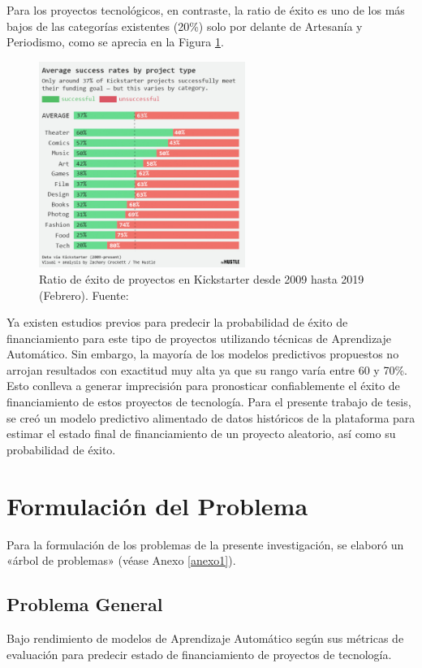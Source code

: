 Para los proyectos tecnológicos, en contraste, la ratio de éxito es uno de los más bajos de las categorías existentes (20\%) solo por delante de Artesanía y Periodismo, como se aprecia en la Figura \ref{1:fig2}.
\begin{figure}[h]
	\begin{center}
		\includegraphics[width=0.6\textwidth]{1/figures/kickstarter_success_rate_2009_2019.jpg}
		\caption{Ratio de éxito de proyectos en Kickstarter desde 2009 hasta 2019 (Febrero). Fuente: \cite{cr_hustle2019successrate}}
		\label{1:fig2}
	\end{center}
\end{figure}


Ya existen estudios previos para predecir la probabilidad de éxito de financiamiento para este tipo de proyectos utilizando técnicas de Aprendizaje Automático. Sin embargo, la mayoría de los modelos predictivos propuestos no arrojan resultados con exactitud muy alta ya que su rango varía entre 60 y 70\%. Esto conlleva a generar imprecisión para pronosticar confiablemente el éxito de financiamiento de estos proyectos de tecnología. Para el presente trabajo de tesis, se creó un modelo predictivo alimentado de datos históricos de la plataforma para estimar el estado final de financiamiento de un proyecto aleatorio, así como su probabilidad de éxito. 



\section{Formulación del Problema}
Para la formulación de los problemas de la presente investigación, se elaboró un «árbol de problemas» (véase Anexo \ref{anexo1}).

\subsection{Problema General}
\newcommand{\ProblemaGeneral}{
Bajo rendimiento de modelos de Aprendizaje Automático según sus métricas de evaluación para predecir estado de financiamiento de proyectos de tecnología. 
}
\ProblemaGeneral
